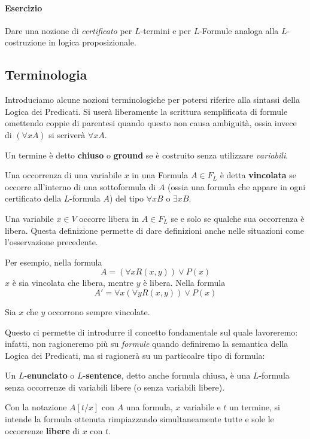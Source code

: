 \paragraph{Esercizio} Dare una nozione di \textit{certificato} per 
$L$-termini e per $L$-Formule analoga alla $L$-costruzione in logica proposizionale. 

\subsection{Terminologia}
Introduciamo alcune nozioni terminologiche per potersi riferire alla sintassi 
della Logica dei Predicati.
Si userà liberamente la scrittura semplificata di formule omettendo coppie di parentesi
quando questo non causa ambiguità, ossia invece di $(\forall x A)$ si scriverà $\forall x A$.

\begin{defi}
        Un termine è detto \textbf{chiuso} o \textbf{ground} se è costruito 
        senza utilizzare \textit{variabili}. 
\end{defi}

\begin{defi}
        Una occorrenza di una variabile $x$ in una Formula $A \in F_L$ è 
        detta \textbf{vincolata} se occorre all'interno di una sottoformula 
        di $A$ (ossia una formula che appare in ogni certificato della $L$-formula $A$) 
        del tipo $\forall x B$ o $\exists x B$. 
\end{defi}

\begin{defi}
Una variabile $x \in V$ occorre libera in $A \in F_L$ se e solo se qualche  
sua occorrenza è libera. Questa definizione permette di dare definizioni 
anche nelle situazioni come l'osservazione precedente.
\end{defi}

Per esempio, nella formula 
$$
A = (\forall x R(x,y)) \lor P(x)
$$
$x$ è sia vincolata che libera, mentre $y$ è libera. 
Nella formula 
$$
A' = \forall x (\forall y R(x,y)) \lor P(x)
$$

Sia $x$ che $y$ occorrono sempre vincolate. 

Questo ci permette di introdurre il concetto fondamentale sul quale lavoreremo: 
infatti, non ragioneremo più su \textit{formule} quando definiremo la semantica 
della Logica dei Predicati, ma si ragionerà su un particoalre tipo di formula: 
\begin{defi}
        Un $L$-\textbf{enunciato} o $L$-\textbf{sentence}, detto anche formula 
        chiusa, è una $L$-formula senza occorrenze di variabili libere 
        (o senza variabili libere).
\end{defi}

\begin{defi}[Sostituzione]
        Con la notazione $A[t/x]$ con $A$ una formula, $x$ variabile 
        e $t$ un termine, si intende la formula ottenuta rimpiazzando 
        simultaneamente tutte e sole le occorrenze \textbf{libere} di $x$ 
        con $t$. 
\end{defi}
